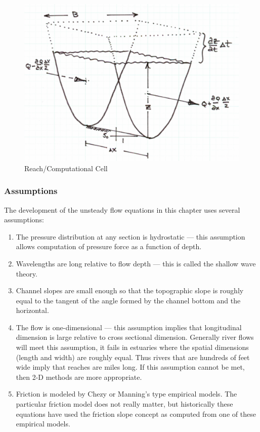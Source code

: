 \begin{figure}[h!] %
   \centering
   \includegraphics[width=5in]{reach_sketch.jpg} 
   \caption{Reach/Computational Cell}
   \label{fig:reach_sketch}
\end{figure}

\subsubsection{Assumptions}
The development of the unsteady flow equations in this chapter uses several assumptions:
\begin{enumerate}
\item The pressure distribution at any section is hydrostatic --- this assumption allows computation of pressure force as a function of depth.
\item Wavelengths are long relative to flow depth --- this is called the shallow wave theory.
\item Channel slopes are small enough so that the topographic slope is roughly equal to the tangent of the angle formed by the channel bottom and the horizontal. 
\item The flow is one-dimensional --- this assumption implies that longitudinal dimension is large relative to cross sectional dimension.  Generally river flows will meet this assumption, it fails in estuaries where the spatial dimensions (length and width) are roughly equal.  Thus rivers that are hundreds of feet wide imply that reaches are miles long.  If this assumption cannot be met, then 2-D methods are more appropriate.
\item Friction is modeled by Chezy or Manning's type empirical models.  The particular friction model does not really matter, but historically these equations have used the friction slope concept as computed from one of these empirical models.
\end{enumerate}

